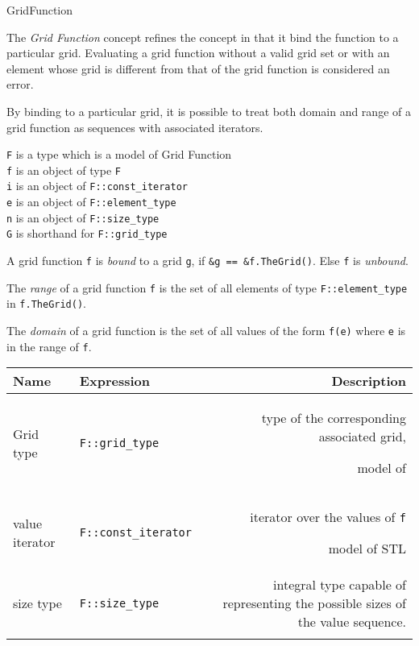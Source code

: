 \begin{Label}{GridFunction}
\end{Label}


The  {\em Grid Function\/} concept refines the 
 concept
in that it bind the function
to a particular grid. 
Evaluating  a grid function without a valid grid set or
with an element whose grid is different from that of the grid function
is considered an error.

By binding to a particular grid, it is possible to treat both domain
and range of a grid function as  sequences with associated iterators.


{\tt F} is a type which is a model of  Grid  Function 
\\
{\tt f} is an object of type  {\tt F}
\\
{\tt i} is an object of  {\tt F::const\_iterator}
\\
{\tt e} is an object of  {\tt F::element\_type}
\\
{\tt n} is an object of  {\tt F::size\_type}
\\
{\tt G} is shorthand for  {\tt F::grid\_type}

\label{bound}
A grid function {\tt f} is {\em bound\/} to a grid {\tt g},
if {\tt \&g == \&f.TheGrid()}. Else  {\tt f} is {\em unbound\/}.

\label{range}    
The {\em range\/} of a grid function {\tt f} is the set of all elements of type
{\tt F::element\_type} in {\tt f.TheGrid()}.

\label{domain}
The {\em domain\/} of a grid function is the set of all values of the form {\tt f(e)} 
where {\tt e} is in the range of {\tt f}.


\begin{tabularx}{14cm}{llR}
  \T  \hline
  \bf  Name  &\bf  Expression  &\bf  Description   \\ 
  \hline
  Grid type & 
  {\tt F::grid\_type} &
  type of the corresponding associated grid,
  \par model of  
  \\ 
  value iterator &
  {\tt F::const\_iterator} &
  iterator over the values of {\tt f}
  \par model of STL
  \\ 
  size type & 
  {\tt F::size\_type} &
  integral type capable of representing the possible sizes
  of the value sequence.
  \T \\   \hline  \\
\end{tabularx}

